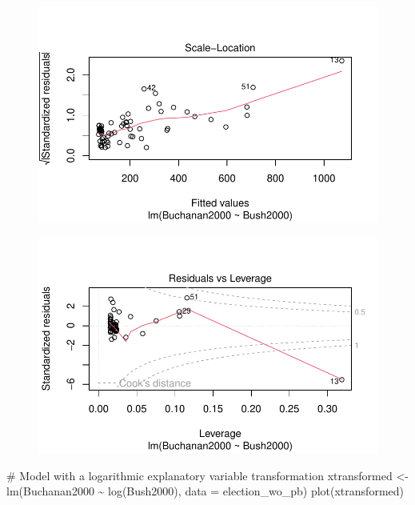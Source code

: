 \documentclass[
  letterpaper,
  DIV=11,
  numbers=noendperiod]{scrartcl}
\newenvironment{Shaded}{\begin{snugshade}}{\end{snugshade}}
\newcommand{\AttributeTok}[1]{\textcolor[rgb]{0.40,0.45,0.13}{#1}}
\newcommand{\CommentTok}[1]{\textcolor[rgb]{0.37,0.37,0.37}{#1}}
\newcommand{\FunctionTok}[1]{\textcolor[rgb]{0.28,0.35,0.67}{#1}}
\newcommand{\NormalTok}[1]{\textcolor[rgb]{0.00,0.23,0.31}{#1}}
\newcommand{\OtherTok}[1]{\textcolor[rgb]{0.00,0.23,0.31}{#1}}
\newcommand{\SpecialCharTok}[1]{\textcolor[rgb]{0.37,0.37,0.37}{#1}}
\begin{document}
\begin{figure}[H]

{\centering \includegraphics{case_study_1_files/figure-pdf/unnamed-chunk-4-5.pdf}

}

\end{figure}

\begin{figure}[H]

{\centering \includegraphics{case_study_1_files/figure-pdf/unnamed-chunk-4-6.pdf}

}

\end{figure}

\begin{Shaded}
\begin{Highlighting}[]
\CommentTok{\# Model with a logarithmic explanatory variable transformation}
\NormalTok{xtransformed }\OtherTok{\textless{}{-}} \FunctionTok{lm}\NormalTok{(Buchanan2000 }\SpecialCharTok{\textasciitilde{}} \FunctionTok{log}\NormalTok{(Bush2000), }\AttributeTok{data =}\NormalTok{ election\_wo\_pb)}
\FunctionTok{plot}\NormalTok{(xtransformed)}
\end{Highlighting}
\end{Shaded}
\end{document}
